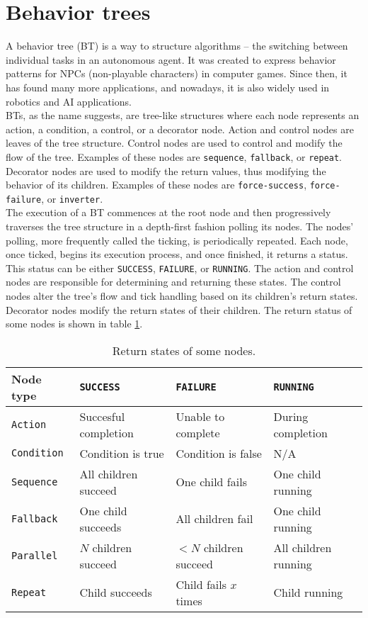\section{Behavior trees}
    A behavior tree (BT) is a way to structure algorithms -- the switching between individual tasks in an autonomous agent. It was created to express behavior patterns for NPCs (non-playable characters) in computer games. Since then, it has found many more applications, and nowadays, it is also widely used in robotics and AI applications.\\
    BTs, as the name suggests, are tree-like structures where each node represents an action, a condition, a control, or a decorator node. Action and control nodes are leaves of the tree structure. Control nodes are used to control and modify the flow of the tree. Examples of these nodes are \texttt{sequence}, \texttt{fallback}, or \texttt{repeat}. Decorator nodes are used to modify the return values, thus modifying the behavior of its children. Examples of these nodes are \texttt{force-success}, \texttt{force-failure}, or \texttt{inverter}.\\
    The execution of a BT commences at the root node and then progressively traverses the tree structure in a depth-first fashion polling its nodes. The nodes' polling, more frequently called the ticking, is periodically repeated. Each node, once ticked, begins its execution process, and once finished, it returns a status. This status can be either \texttt{SUCCESS}, \texttt{FAILURE}, or \texttt{RUNNING}. The action and control nodes are responsible for determining and returning these states. The control nodes alter the tree's flow and tick handling based on its children's return states. Decorator nodes modify the return states of their children. The return status of some nodes is shown in table \ref{tab:returns}.
    \begin{table}[H]
        \centering
        \begin{tabular}{|l|l|l|l|}
            \hline
            Node type & \texttt{SUCCESS} & \texttt{FAILURE} & \texttt{RUNNING} \\
            \hline\hline
            \texttt{Action} & Succesful completion & Unable to complete & During completion \\
            \hline
            \texttt{Condition} & Condition is true & Condition is false & N/A \\
            \hline
            \texttt{Sequence} & All children succeed & One child fails & One child running \\
            \hline
            \texttt{Fallback} & One child succeeds & All children fail & One child running \\
            \hline
            \texttt{Parallel} & $N$ children succeed & $<N$ children succeed & All children running \\
            \hline
            \texttt{Repeat} & Child succeeds & Child fails $x$ times & Child running \\
            \hline
        \end{tabular}
        \caption{Return states of some nodes.}
        \label{tab:returns}
    \end{table}

